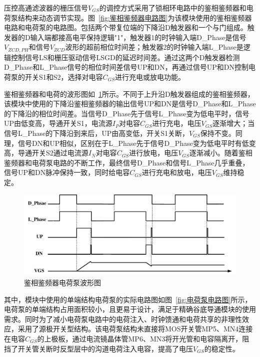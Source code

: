 压控高通滤波器的栅压信号$V_{GS}$的调控方式采用了锁相环电路中的鉴相鉴频器和电荷泵结构来动态调节实现。图~\ref{fig:鉴相鉴频器电路图}为该模块使用的鉴相鉴频器电路和电荷泵的电路图。包括两个带复位端的下降沿D触发器和一个与门组成。触发器的D输入端都接高电平保持逻辑"1"，触发器1的时钟输入端D\_Phase是信号$V_{ZCD,PH}$和信号$V_{ZCD}$波形的超前相位时间差；触发器2的时钟输入端L\_Phase是逻辑控制信号LS和栅压驱动信号LSGD的延迟时间差。通过这两个D触发器检测D\_Phase和L\_Phase信号的相位时间差信号UP和DN，再通过信号UP和DN控制电荷泵的开关S1和S2，选择对电容$C_{GS}$进行充电或放电功能。


鉴相鉴频器和电荷的波形图如~\ref{fig:鉴相鉴频器波形图}所示。不同于上升沿D触发器组成的鉴相鉴频器，该模块中使用的下降沿鉴相鉴频器的输出信号UP和DN是信号D\_Phase和L\_Phase的下降沿的相位时间差。当信号D\_Phase先于信号L\_Phase变为低电平时，信号UP由低变高，导通开关S1，电流源$I_P$对电容$C_{GS}$进行充电，电压$V_{GS}$逐渐增大；当信号L\_Phase的下降沿到来后，UP由高变低，开关S1关断，$V_{GS}$保持不变。同理，信号DN和UP相似，区别在于L\_Phase先于信号D\_Phase变为低电平时有低变高，导通开关S2通过电流源$I_N$对电容$C_{GS}$进行放电，电压$V_{GS}$逐渐减小。随着鉴相鉴频器和电荷泵电路的不断工作，最终信号D\_Phase和信号L\_Phase几乎重叠，信号UP和DN脉冲保持一致，同时给电容$C_{GS}$进行充电和放电，电压$V_{GS}$维持稳定。

\begin{figure}[htbp] 
    \centering
    \includegraphics[width=0.8\linewidth]{figures/鉴相鉴频器波形图.pdf}
    \caption{鉴相鉴频器电荷泵波形图}
    \label{fig:鉴相鉴频器波形图}
\end{figure} 

其中，模块中使用的单端结构电荷泵的实际电路图如图~\ref{fig:电荷泵电路图}所示，电荷泵的单端结构占用面积较小，且更易于设计，满足于精确谷底导通模块的使用需求。同时为了减小电荷泵电路中的电荷注入、时钟馈通和电荷共享的非理性效应，采用了源极开关型结构。该电荷泵结构未直接将MOS开关管MP5、MN4连接在电容$C_{GS}$的上极板，通过电流镜晶体管MP6、MN3将开光管和电容隔离开，阻挡了开关管关断时反型层中的沟道电荷注入电容，提高了电压$V_{GS}$的稳定性。

